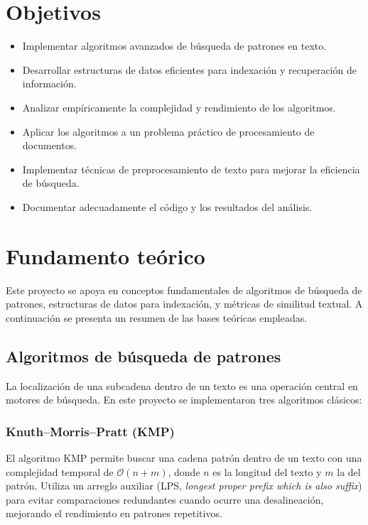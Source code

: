 \documentclass[9pt,letterpaper,onecolumn]{rho-class/rho}
\begin{document}
\section{Objetivos}
\begin{itemize}
    \item Implementar algoritmos avanzados de búsqueda de patrones en texto.
    \item Desarrollar estructuras de datos eficientes para indexación y recuperación de información.
    \item Analizar empíricamente la complejidad y rendimiento de los algoritmos.
    \item Aplicar los algoritmos a un problema práctico de procesamiento de documentos.
    \item Implementar técnicas de preprocesamiento de texto para mejorar la eficiencia de búsqueda.
    \item Documentar adecuadamente el código y los resultados del análisis.
\end{itemize}

\section{Fundamento teórico}
\label{sec:fundamentoteorico}

Este proyecto se apoya en conceptos fundamentales de algoritmos de búsqueda de patrones, estructuras de datos para indexación, y métricas de similitud textual. A continuación se presenta un resumen de las bases teóricas empleadas.

\subsection{Algoritmos de búsqueda de patrones}

La localización de una subcadena dentro de un texto es una operación central en motores de búsqueda. En este proyecto se implementaron tres algoritmos clásicos:

\subsubsection*{Knuth–Morris–Pratt (KMP)}

El algoritmo KMP permite buscar una cadena patrón dentro de un texto con una complejidad temporal de $\mathcal{O}(n + m)$, donde $n$ es la longitud del texto y $m$ la del patrón. Utiliza un arreglo auxiliar (LPS, \textit{longest proper prefix which is also suffix}) para evitar comparaciones redundantes cuando ocurre una desalineación, mejorando el rendimiento en patrones repetitivos.
\end{document}
